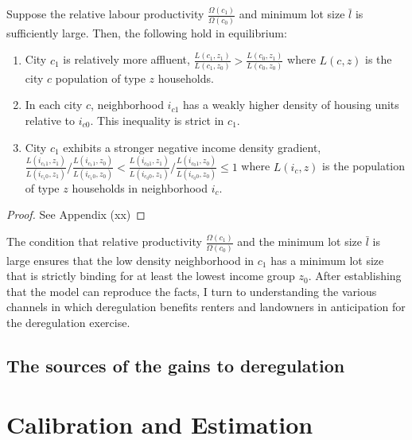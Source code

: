 \documentclass[]{article}
\begin{document}
\begin{Proposition}\label{Prop:toymodel}
	Suppose the relative labour productivity $\frac{\Omega(c_{1})}{\Omega(c_{0})}$ and minimum lot size $\bar{l}$ is sufficiently large. Then, the following hold in equilibrium:
	
	\begin{enumerate}
		\item City $c_{1}$ is relatively more affluent, $\frac{L(c_{1}, z_{1})}{L(c_{1}, z_{0})} > \frac{L(c_{0}, z_{1})}{L(c_{0}, z_{0})}$ where $L(c, z)$ is the city $c$ population of type $z$ households.
		
		\item In each city $c$, neighborhood $i_{c1}$ has a weakly higher density of housing units relative to $i_{c0}$. This inequality is strict in $c_{1}$. 
		
		\item City $c_{1}$ exhibits a stronger negative income density gradient, $\frac{L(i_{c_{1}1}, z_{1})}{L(i_{c_{1}0}, z_{1})}/\frac{L(i_{c_{1}1}, z_{0})}{L(i_{c_{1}0}, z_{0})} < \frac{L(i_{c_{0}1}, z_{1})}{L(i_{c_{0}0}, z_{1})}/\frac{L(i_{c_{0}1}, z_{0})}{L(i_{c_{0}0}, z_{0})} \leq 1$ where $L(i_{c}, z)$ is the population of type $z$ households in neighborhood $i_{c}$. 
	\end{enumerate}

\end{Proposition}
\begin{proof}
	See Appendix (xx)
\end{proof}
The condition that relative productivity $\frac{\Omega(c_{1})}{\Omega(c_{0})} $ and the minimum lot size $\bar{l}$ is large ensures that the low density neighborhood in $c_{1}$ has a minimum lot size that is strictly binding for at least the lowest income group $z_{0}$. After establishing that the model can reproduce the facts, I turn to understanding the various channels in which deregulation benefits renters and landowners in anticipation for the deregulation exercise.

\subsection{The sources of the gains to deregulation}



\newpage
\section{Calibration and Estimation}\label{section:LotSizeMeasure}
\end{document}

